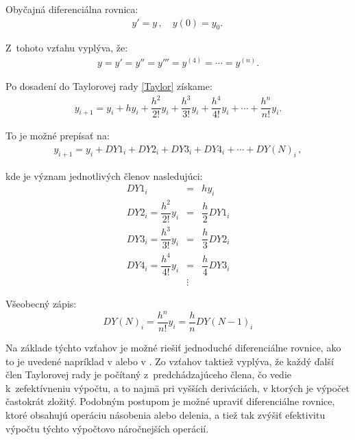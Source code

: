 Obyčajná diferenciálna rovnica:
\begin{eqnarray}
y' = y \, , \quad y(0) = y_{0}. \, \label{jednoducha_rovnica}
\end{eqnarray}

Z~tohoto vzťahu vyplýva, že:
\begin{eqnarray}
y = y' = y'' = y''' = y^{(4)} =\cdots = y^{(n)} .
\end{eqnarray}

Po dosadení do Taylorovej rady \eqref{Taylor} získame:
\begin{eqnarray}
y_{i + 1} = y_{i} + h y_{i} + \dfrac{h^{2}}{2!}y_{i} + \dfrac{h^{3}}{3!}y_{i} + \dfrac{h^{4}}{4!}y_{i} + \cdots + \dfrac{h^{n}}{n!}y_{i} .
\end{eqnarray}


To je možné prepísať na:
\begin{eqnarray}
y_{i + 1} = y_{i} + DY1_{i} + DY2_{i} + DY3_{i} + DY4_{i} + \cdots + DY(N)_{i} \, , \label{TaylorDYcleny}
\end{eqnarray}

kde je význam jednotlivých členov nasledujúci:
\begin{eqnarray}
DY1_{i} & = & h y_{i} \label{DY_cleny} \\
DY2_{i} = \dfrac{h^{2}}{2!}y_{i} & = & \dfrac{h}{2} DY1_{i} \nonumber \\
DY3_{i} = \dfrac{h^{3}}{3!}y_{i} & = & \dfrac{h}{3} DY2_{i} \nonumber \\
DY4_{i} = \dfrac{h^{4}}{4!}y_{i} & = & \dfrac{h}{4} DY3_{i} \nonumber \\
& \vdots & \nonumber
\end{eqnarray}

Všeobecný zápis:
\begin{equation}
DY(N)_{i} =  \dfrac{h^{n}}{n!}y_{i} = \dfrac{h}{n} DY(N-1)_{i} \nonumber
\end{equation}

Na základe týchto vzťahov je možné riešiť jednoduché diferenciálne rovnice, ako to je uvedené napríklad v \cite{OpalkaBP} alebo v \cite{KrausDisP}.
Zo vzťahov taktiež vyplýva, že každý ďalší člen Taylorovej rady je počítaný z~predchádzajúceho člena, čo vedie k~zefektívneniu výpočtu, a to najmä pri vyšších deriváciách, v ktorých je výpočet častokrát zložitý. Podobným postupom je možné upraviť diferenciálne rovnice, ktoré obsahujú operáciu násobenia alebo delenia, a tiež tak zvýšiť efektivitu výpočtu týchto výpočtovo náročnejších operácií. 


